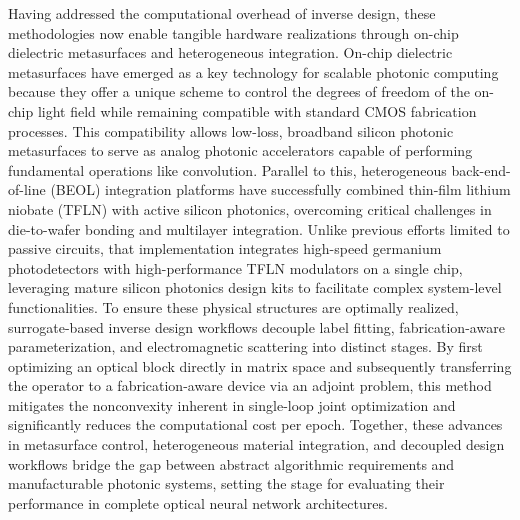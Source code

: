 Having addressed the computational overhead of inverse design, these methodologies now enable tangible hardware realizations through on-chip dielectric metasurfaces and heterogeneous integration. On-chip dielectric metasurfaces have emerged as a key technology for scalable photonic computing because they offer a unique scheme to control the degrees of freedom of the on-chip light field while remaining compatible with standard CMOS fabrication processes. This compatibility allows low-loss, broadband silicon photonic metasurfaces to serve as analog photonic accelerators capable of performing fundamental operations like convolution. Parallel to this, heterogeneous back-end-of-line (BEOL) integration platforms have successfully combined thin-film lithium niobate (TFLN) with active silicon photonics, overcoming critical challenges in die-to-wafer bonding and multilayer integration. Unlike previous efforts limited to passive circuits, that implementation integrates high-speed germanium photodetectors with high-performance TFLN modulators on a single chip, leveraging mature silicon photonics design kits to facilitate complex system-level functionalities. To ensure these physical structures are optimally realized, surrogate-based inverse design workflows decouple label fitting, fabrication-aware parameterization, and electromagnetic scattering into distinct stages. By first optimizing an optical block directly in matrix space and subsequently transferring the operator to a fabrication-aware device via an adjoint problem, this method mitigates the nonconvexity inherent in single-loop joint optimization and significantly reduces the computational cost per epoch. Together, these advances in metasurface control, heterogeneous material integration, and decoupled design workflows bridge the gap between abstract algorithmic requirements and manufacturable photonic systems, setting the stage for evaluating their performance in complete optical neural network architectures. \citep{doi_10_1515_nanoph_2022_0294_1bd118d5} \citep{s2_9b444e84d20ae6e3d62d2d4df30268b5a53baad2_40af2cc9} \citep{s2_753a5d83a96e0194da93bcb6f20fa0bd356e37fa_c11e3796}

